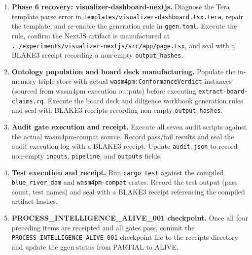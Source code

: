 \begin{enumerate}
  \item \textbf{Phase 6 recovery: visualizer-dashboard-nextjs.} Diagnose the Tera template
    parse error in \texttt{templates/visualizer-dashboard.tsx.tera}, repair the template, and
    re-enable the generation rule in \texttt{ggen.toml}. Execute the rule, confirm the NextJS
    artifact is manufactured at
    \texttt{../experiments/visualizer-nextjs/src/app/page.tsx}, and seal with a BLAKE3 receipt
    recording a non-empty \texttt{output\_hashes}.
  \item \textbf{Ontology population and board deck manufacturing.} Populate the in-memory triple
    store with actual \texttt{wasm4pm:ConformanceVerdict} instances (sourced from wasm4pm
    execution outputs) before executing \texttt{extract-board-claims.rq}. Execute the board deck
    and diligence workbook generation rules and seal with BLAKE3 receipts recording non-empty
    \texttt{output\_hashes}.
  \item \textbf{Audit gate execution and receipt.} Execute all seven audit scripts against the
    actual wasm4pm-compat source. Record pass/fail results and seal the audit execution log with
    a BLAKE3 receipt. Update \texttt{audit.json} to record non-empty \texttt{inputs},
    \texttt{pipeline}, and \texttt{outputs} fields.
  \item \textbf{Test execution and receipt.} Run \texttt{cargo test} against the compiled
    \texttt{blue\_river\_dam} and \texttt{wasm4pm-compat} crates. Record the test output
    (pass count, test names) and seal with a BLAKE3 receipt referencing the compiled artifact
    hashes.
  \item \textbf{PROCESS\_INTELLIGENCE\_ALIVE\_001 checkpoint.} Once all four preceding items
    are receipted and all gates pass, commit the \texttt{PROCESS\_INTELLIGENCE\_ALIVE\_001}
    checkpoint file to the receipts directory and update the ggen status from PARTIAL to ALIVE.
\end{enumerate}
